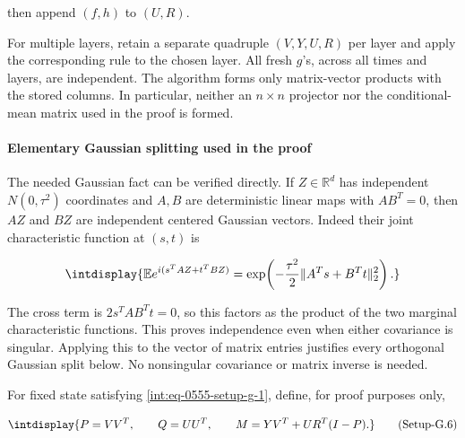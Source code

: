 
then append \((f,\allowbreak h)\) to \((U,\allowbreak R)\).



For multiple layers, retain a separate quadruple \((V,\allowbreak Y,\allowbreak U,\allowbreak R)\) per layer and apply the corresponding rule to the chosen layer. All fresh \(g\)'s, across all times and layers, are independent. The algorithm forms only matrix-vector products with the stored columns. In particular, neither an \(n\times n\) projector nor the conditional-mean matrix used in the proof is formed.


\paragraph{Elementary Gaussian splitting used in the proof}
\label{int:setup-sampler-3}
\mbox{}\par\smallskip


The needed Gaussian fact can be verified directly. If \(Z\in\mathbb R^d\) has independent \(N(0,\allowbreak \tau^2)\) coordinates and \(A,\allowbreak B\) are deterministic linear maps with \(AB^T=0\), then \(AZ\) and \(BZ\) are independent centered Gaussian vectors. Indeed their joint characteristic function at \((s,\allowbreak t)\) is


\begingroup\renewcommand{\theHequation}{intdisplay.1060}
\begin{equation*}
\intdisplay{
\mathbb E e^{i(s^TAZ+t^TBZ)}
 =\exp\!\left(-\frac{\tau^2}{2}
       \|A^T s+B^Tt\|_2^2\right).
}
\end{equation*}
\endgroup


The cross term is \(2s^TAB^Tt=0\), so this factors as the product of the two marginal characteristic functions. This proves independence even when either covariance is singular. Applying this to the vector of matrix entries justifies every orthogonal Gaussian split below. No nonsingular covariance or matrix inverse is needed.



For fixed state satisfying \hyperref[int:eq-setup-g-1]{\eqref{int:eq-0555-setup-g-1}}, define, for proof purposes only,


\label{int:eq-setup-g-6}
\begingroup\renewcommand{\theHequation}{intdisplay.1061}
\begin{equation}
\intdisplay{
P=VV^T,\qquad Q=UU^T,\qquad
 M=YV^T+UR^T(I-P).
}
\tag{Setup-G.6}
\label{int:eq-0560-setup-g-6}
\end{equation}
\endgroup

